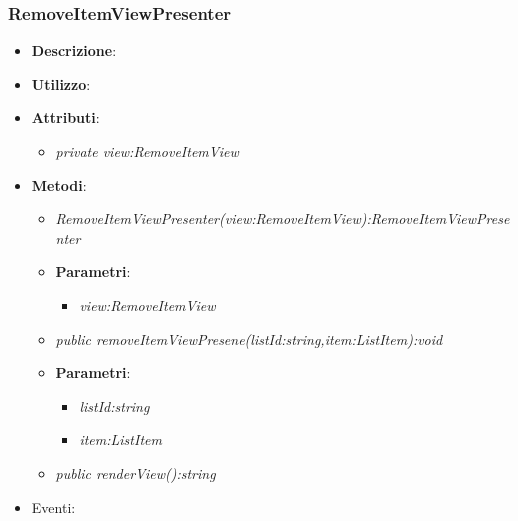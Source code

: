 \subsubsection{RemoveItemViewPresenter}
\begin{itemize}
\item \textbf{Descrizione}: 
\item \textbf{Utilizzo}:
\item \textbf{Attributi}: 
	\begin{itemize}
	\item \textit{private view:RemoveItemView}\\

	\end{itemize}
\item \textbf{Metodi}:
	\begin{itemize}
	\item \textit{RemoveItemViewPresenter(view:RemoveItemView):RemoveItemViewPresenter}\\

			\item{\textbf{Parametri}: \begin{itemize}
			\item \textit{view:RemoveItemView}\\
			
			\end{itemize}}
	\item \textit{public removeItemViewPresene(listId:string,item:ListItem):void}\\

			\item{\textbf{Parametri}: \begin{itemize}
			\item \textit{listId:string}\\

			\item \textit{item:ListItem}\\

			\end{itemize}}
	\item \textit{public renderView():string}\\

	\end{itemize}
\item{Eventi}:
\end{itemize}

